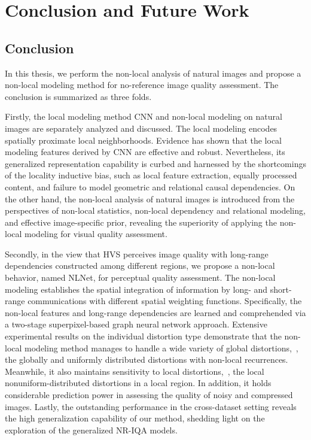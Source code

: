 \chapter{Conclusion and Future Work}\label{chap:conclusion}
\section{Conclusion}
In this thesis, we perform the non-local analysis of natural images and propose a non-local modeling method for no-reference image quality assessment. The conclusion is summarized as three folds.

Firstly, the local modeling method CNN and non-local modeling on natural images are separately analyzed and discussed. The local modeling encodes spatially proximate local neighborhoods. Evidence has shown that the local modeling features derived by CNN are effective and robust. Nevertheless, its generalized representation capability is curbed and harnessed by the shortcomings of the locality inductive bias, such as local feature extraction, equally processed content, and failure to model geometric and relational causal dependencies. On the other hand, the non-local analysis of natural images is introduced from the perspectives of non-local statistics, non-local dependency and relational modeling, and effective image-specific prior, revealing the superiority of applying the non-local modeling for visual quality assessment.

Secondly, in the view that HVS perceives image quality with long-range dependencies constructed among different regions, we propose a non-local behavior, named NLNet, for perceptual quality assessment. The non-local modeling establishes the spatial integration of information by long- and short-range communications with different spatial weighting functions. Specifically, the non-local features and long-range dependencies are learned and comprehended via a two-stage superpixel-based graph neural network approach. Extensive experimental results on the individual distortion type demonstrate that the non-local modeling method manages to handle a wide variety of global distortions,~\ie, the globally and uniformly distributed distortions with non-local recurrences. Meanwhile, it also maintains sensitivity to local distortions,~\ie, the local nonuniform-distributed distortions in a local region. In addition, it holds considerable prediction power in assessing the quality of noisy and compressed images. Lastly, the outstanding performance in the cross-dataset setting reveals the high generalization capability of our method, shedding light on the exploration of the generalized NR-IQA models.

